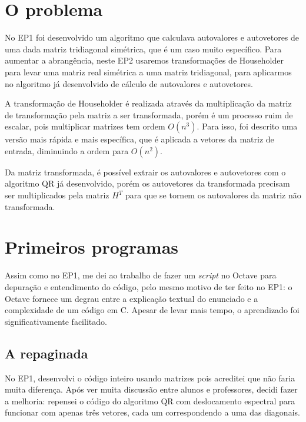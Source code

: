 \documentclass[12pt]{article} %
\begin{document}
    \section{O problema}
        
        No EP1 foi desenvolvido um algoritmo que calculava autovalores e autovetores de uma dada matriz tridiagonal simétrica, que é um caso muito específico. Para aumentar a abrangência, neste EP2 usaremos transformações de Householder para levar uma matriz real simétrica a uma matriz tridiagonal, para aplicarmos no algoritmo já desenvolvido de cálculo de autovalores e autovetores.
        
        A transformação de Householder é realizada através da multiplicação da matriz de transformação pela matriz a ser transformada, porém é um processo ruim de escalar, pois multiplicar matrizes tem ordem $O(n^3)$. Para isso, foi descrito uma versão mais rápida e mais específica, que é aplicada a vetores da matriz de entrada, diminuindo a ordem para $O(n^2)$.
        
        Da matriz transformada, é possível extrair os autovalores e autovetores com o algoritmo QR já desenvolvido, porém os autovetores da transformada precisam ser multiplicados pela matriz $H^T$ para que se tornem os autovalores da matriz não transformada.
        
        \vspace{\baselineskip}
        
    \section{Primeiros programas}
        
        Assim como no EP1, me dei ao trabalho de fazer um \textit{script} no Octave para depuração e entendimento do código, pelo mesmo motivo de ter feito no EP1: o Octave fornece um degrau entre a explicação textual do enunciado e a complexidade de um código em C. Apesar de levar mais tempo, o aprendizado foi significativamente facilitado.
        
        \subsection{A repaginada}
            
            No EP1, desenvolvi o código inteiro usando matrizes pois acreditei que não faria muita diferença. Após ver muita discussão entre alunos e professores, decidi fazer a melhoria: repensei o código do algoritmo QR com deslocamento espectral para funcionar com apenas três vetores, cada um correspondendo a uma das diagonais.
            
\end{document}
